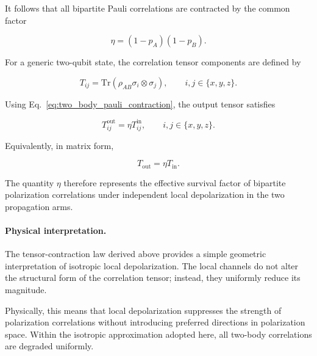 \medskip

It follows that all bipartite Pauli correlations are contracted by the common factor

\begin{equation}
\eta
=
(1-p_A)(1-p_B).
\label{eq:two_arm_correlation_survival_factor}
\end{equation}

\medskip

For a generic two-qubit state, the correlation tensor components are defined by

\begin{equation}
T_{ij}
=
\mathrm{Tr}
\left(
\rho_{AB}
\sigma_i\otimes\sigma_j
\right),
\qquad
i,j\in\{x,y,z\}.
\end{equation}

Using Eq.~\eqref{eq:two_body_pauli_contraction}, the output tensor satisfies

\begin{equation}
T_{ij}^{\mathrm{out}}
=
\eta
T_{ij}^{\mathrm{in}},
\qquad
i,j\in\{x,y,z\}.
\label{eq:correlation_tensor_component_contraction}
\end{equation}

Equivalently, in matrix form,

\begin{equation}
T_{\mathrm{out}}
=
\eta
T_{\mathrm{in}}.
\label{eq:correlation_tensor_contraction_law}
\end{equation}

\medskip

The quantity \( \eta \) therefore represents the effective survival factor of bipartite polarization correlations under independent local depolarization in the two propagation arms.

\medskip

\paragraph{Physical interpretation.}

The tensor-contraction law derived above provides a simple geometric interpretation of isotropic local depolarization. The local channels do not alter the structural form of the correlation tensor; instead, they uniformly reduce its magnitude.

\medskip

Physically, this means that local depolarization suppresses the strength of polarization correlations without introducing preferred directions in polarization space. Within the isotropic approximation adopted here, all two-body correlations are degraded uniformly.


